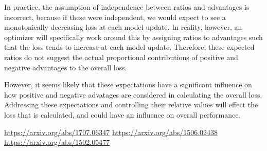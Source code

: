 \documentclass[letterpaper,twocolumn,10pt]{article}
\begin{document}
In practice, the assumption of independence between ratios and advantages is
incorrect, because if these were independent, we would expect to see a
monotonically decreasing loss at each model update. In reality, however, an
optimizer will specifically work around this by assigning ratios to advantages
such that the loss tends to increase at each model update. Therefore, these
expected ratios do not suggest the actual proportional contributions of
positive and negative advantages to the overall loss.

However, it seems likely that these expectations have a significant influence
on how positive and negative advatages are considered in calculating the
overall loss. Addressing these expectations and controlling their relative
values will effect the loss that is calculated, and could have an influence on
overall performance.

\theendnotes

\begin{thebibliography}{9}
\url{https://arxiv.org/abs/1707.06347}
\url{https://arxiv.org/abs/1506.02438}
\url{https://arxiv.org/abs/1502.05477}
\end{thebibliography}
\end{document}
